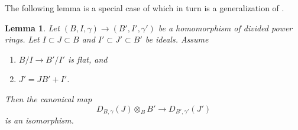 \documentclass{stacks-project}
\theoremstyle{plain}
\newtheorem{lemma}[subsection]{Lemma}
\theoremstyle{definition}
\theoremstyle{remark}
\numberwithin{equation}{subsection}
\begin{document}
\noindent
The following lemma is a special case of
\cite[Proposition 2.1.7]{dJ-crystalline} which in turn is a
generalization of \cite[Proposition 2.8.2]{Berthelot}.

\begin{lemma}
\label{lemma-flat-extension-divided-power-envelope}
Let $(B, I, \gamma) \to (B', I', \gamma')$ be a homomorphism of
divided power rings. Let $I \subset J \subset B$ and
$I' \subset J' \subset B'$ be ideals. Assume
\begin{enumerate}
\item $B/I \to B'/I'$ is flat, and
\item $J' = JB' + I'$.
\end{enumerate}
Then the canonical map
$$
D_{B, \gamma}(J) \otimes_B B' \longrightarrow D_{B', \gamma'}(J')
$$
is an isomorphism.
\end{lemma}
\end{document}
